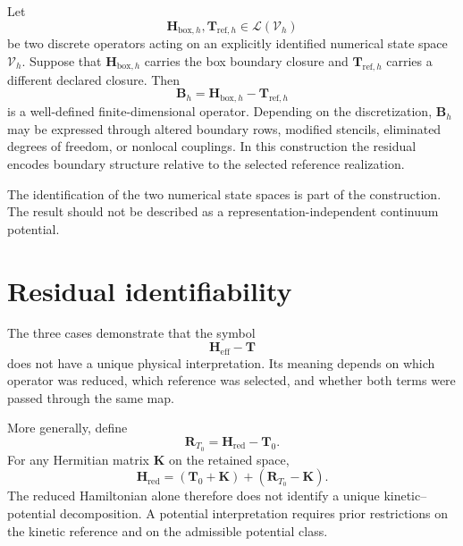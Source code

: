 Let
\begin{equation}
    \mathbf H_{\mathrm{box},h},
    \mathbf T_{\mathrm{ref},h}
    \in
    \mathcal L(\mathcal V_h)
\end{equation}
be two discrete operators acting on an explicitly identified numerical state
space $\mathcal V_h$. Suppose that $\mathbf H_{\mathrm{box},h}$ carries the
box boundary closure and $\mathbf T_{\mathrm{ref},h}$ carries a different
declared closure. Then
\begin{equation}
    \mathbf B_h
    =
    \mathbf H_{\mathrm{box},h}
    -
    \mathbf T_{\mathrm{ref},h}
\end{equation}
is a well-defined finite-dimensional operator. Depending on the
discretization, $\mathbf B_h$ may be expressed through altered boundary rows,
modified stencils, eliminated degrees of freedom, or nonlocal couplings. In
this construction the residual encodes boundary structure relative to the
selected reference realization.

The identification of the two numerical state spaces is part of the
construction. The result should not be described as a
representation-independent continuum potential.

\section*{Residual identifiability}

The three cases demonstrate that the symbol
\begin{equation}
    \mathbf H_{\mathrm{eff}}-\mathbf T
\end{equation}
does not have a unique physical interpretation. Its meaning depends on which
operator was reduced, which reference was selected, and whether both terms
were passed through the same map.

More generally, define
\begin{equation}
    \mathbf R_{T_0}
    =
    \mathbf H_{\mathrm{red}}-\mathbf T_0.
\end{equation}
For any Hermitian matrix $\mathbf K$ on the retained space,
\begin{equation}
    \mathbf H_{\mathrm{red}}
    =
    (\mathbf T_0+\mathbf K)
    +
    (\mathbf R_{T_0}-\mathbf K).
\end{equation}
The reduced Hamiltonian alone therefore does not identify a unique
kinetic--potential decomposition. A potential interpretation requires prior
restrictions on the kinetic reference and on the admissible potential class.

